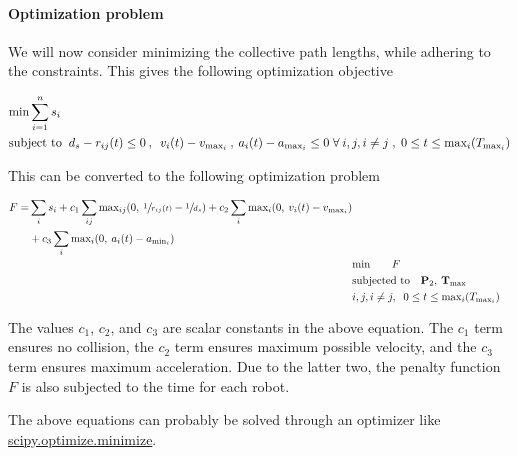 \paragraph{Optimization problem}

We will now consider minimizing the collective path lengths, while adhering to the constraints. This gives the following optimization objective

\begin{align*}
    &\textup{min} \sum_{i=1}^{n} s_i
    \\
    &\textup{subject to} \;\; d_s - r_{ij}(t) \leq 0 \:,\: \; 
    v_i(t) - v_{\textup{max}_i} \:,\: a_i(t) - a_{\textup{max}_i} \leq 0
    \;
    \forall \: i,j,i \neq j \;,\; 0 \leq t \leq \textup{max}_i (T_{\textup{max}_i})
\end{align*}

This can be converted to the following optimization problem

\begin{align}
    \begin{split}
        F =& \sum_{i} s_i + c_1 \sum_{ij} \textup{max}_{ij} (0,\: \sfrac{1}{r_{ij}(t)} - \sfrac{1}{d_s}) + c_2 \sum_i \textup{max}_i (0,\: v_i(t) - v_{\textup{max}_i}) \\
        & + c_3 \sum_{i} \textup{max}_i (0,\: a_i(t) - a_{\textup{min}_i})
    \end{split} 
    \nonumber \\
    &\textup{min} \qquad F
    \nonumber \\
    &\textup{subjected to} \quad \mathbf{P}_2,\: \mathbf{T}_{\textup{max}}
    \nonumber \\
    & i, j, i \neq j,\;\; 0 \leq t \leq \textup{max}_i (T_{\textup{max}_i})
\end{align}

The values $c_1$, $c_2$, and $c_3$ are scalar constants in the above equation. The $c_1$ term ensures no collision, the $c_2$ term ensures maximum possible velocity, and the $c_3$ term ensures maximum acceleration. Due to the latter two, the penalty function $F$ is also subjected to the time for each robot.

The above equations can probably be solved through an optimizer like \href{https://docs.scipy.org/doc/scipy/reference/generated/scipy.optimize.minimize.html}{scipy.optimize.minimize}.

